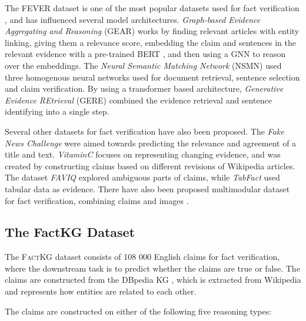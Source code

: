 \documentclass[11pt]{article}
\begin{document}
The FEVER dataset is one of the most popular datasets used for fact verification \citep{thorne2018fever}, and has influenced several model architectures. \emph{Graph-based Evidence Aggregating and Reasoning} (GEAR) \citep{zhou2019gear} works by finding relevant articles with entity linking, giving them a relevance score, embedding the claim and sentences in the relevant evidence with a pre-trained BERT \citep{devlin2018bert}, and then using a GNN to reason over the embeddings. The \emph{Neural Semantic Matching Network} (NSMN) \citep{nie2019combining} used three homogenous neural networks used for document retrieval, sentence selection and claim verification. By using a transformer based architecture, \emph{Generative Evidence REtrieval} (GERE) \citep{chen2022gere} combined the evidence retrieval and sentence identifying into a single step.

Several other datasets for fact verification have also been proposed. The \emph{Fake News Challenge} \citep{hanselowski2018retrospective_fake_news} were aimed towards predicting the relevance and agreement of a title and text. \emph{VitaminC} \citep{schuster2021get_your_vitamin_C} focuses on representing changing evidence, and was created by constructing claims based on different revisions of Wikipedia articles. The dataset \emph{FAVIQ} \citep{park2021faviq} explored ambiguous parts of claims, while \emph{TabFact} \citep{chen2019tabfact} used tabular data as evidence. There have also been proposed multimodular dataset for fact verification, combining claims and images \citep{zlatkova2019fact-checking_meets_fauxtography, mishra2022factify}.

\subsection{The FactKG Dataset}

The \textsc{FactKG} dataset \citep{kim2023factkg} consists of 108 000 English claims for fact verification, where the downstream task is to predict whether the claims are true or false. The claims are constructed from the DBpedia KG \citep{lehmann2015dbpedia}, which is extracted from Wikipedia and represents how entities are related to each other.

The claims are constructed on either of the following five reasoning types:
\end{document}
